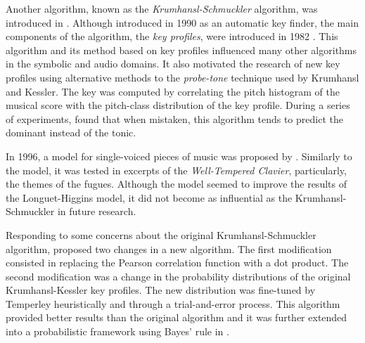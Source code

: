Another algorithm, known as the \emph{Krumhansl-Schmuckler}
algorithm, was introduced in
\textcite{krumhansl1990cognitive}. Although introduced in
1990 as an automatic key finder, the main components of the
algorithm, the \emph{key profiles}, were introduced in 1982
\parencite{krumhansl1982tracing}. This algorithm and its
method based on key profiles influenced many other
algorithms in the symbolic and audio domains. It also
motivated the research of new key profiles using alternative
methods to the \emph{probe-tone} technique used by Krumhansl
and Kessler. The key was computed by correlating the pitch
histogram of the musical score with the pitch-class
distribution of the key profile. During a series of
experiments, \textcite{sapp2011computational} found that
when mistaken, this algorithm tends to predict the dominant
instead of the tonic.

In 1996, a model for single-voiced pieces of music was
proposed by \textcite{vos1996parallelprocessing}. Similarly
to the \textcite{longuethiggins1971interpreting} model, it
was tested in excerpts of the \emph{Well-Tempered Clavier},
particularly, the themes of the fugues. Although the model
seemed to improve the results of the Longuet-Higgins model,
it did not become as influential as the Krumhansl-Schmuckler
in future research.

Responding to some concerns about the original
Krumhansl-Schmuckler algorithm,
\textcite{temperley1999whats} proposed two changes in a new
algorithm. The first modification consisted in replacing the
Pearson correlation function with a dot product. The second
modification was a change in the probability distributions
of the original Krumhansl-Kessler key profiles. The new
distribution was fine-tuned by Temperley heuristically and
through a trial-and-error process. This algorithm provided
better results than the original algorithm and it was
further extended into a probabilistic framework using Bayes'
rule in \textcite{temperley2002bayesian}.





